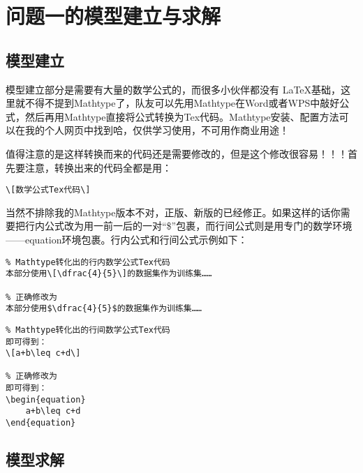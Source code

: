 \section{问题一的模型建立与求解}


\subsection{模型建立}

模型建立部分是需要有大量的数学公式的，而很多小伙伴都没有 \LaTeX 基础，这里就不得不提到Mathtype了，队友可以先用Mathtype在Word或者WPS中敲好公式，然后再用Mathtype直接将公式转换为Tex代码。Mathtype安装、配置方法可以在我的个人网页中找到哈，仅供学习使用，不可用作商业用途！

值得注意的是这样转换而来的代码还是需要修改的，但是这个修改很容易！！！首先要注意，转换出来的代码全都是用：

\begin{lstlisting}
\[数学公式Tex代码\]
\end{lstlisting}

当然不排除我的Mathtype版本不对，正版、新版的已经修正。如果这样的话你需要把行内公式改为用一前一后的一对“\$”包裹，而行间公式则是用专门的数学环境——equation环境包裹。行内公式和行间公式示例如下：

\begin{lstlisting}
% Mathtype转化出的行内数学公式Tex代码
本部分使用\[\dfrac{4}{5}\]的数据集作为训练集……

% 正确修改为
本部分使用$\dfrac{4}{5}$的数据集作为训练集……
\end{lstlisting}

\begin{lstlisting}
% Mathtype转化出的行间数学公式Tex代码
即可得到：
\[a+b\leq c+d\]

% 正确修改为
即可得到：
\begin{equation}
    a+b\leq c+d
\end{equation}
\end{lstlisting}





\subsection{模型求解}